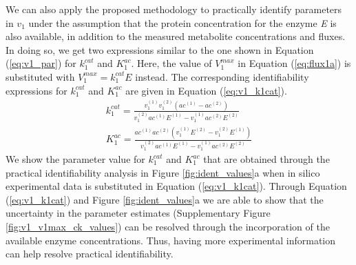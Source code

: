 \documentclass[10pt]{article}
\begin{document}
	We can also apply the proposed methodology to practically identify parameters in $v_1$ under the assumption that the protein concentration for the enzyme \textit{E} is also available, in addition to the measured metabolite concentrations and fluxes. In doing so, we get two expressions similar to the one shown in Equation (\ref{eq:v1_par}) for $k_1^{cat}$ and $K_1^{ac}$. Here, the value of $V_1^{max}$ in Equation (\ref{eq:flux1a}) is substituted with $V_1^{max} = k_1^{cat}E$ instead. The corresponding identifiability expressions for $k_1^{cat}$ and $K_1^{ac}$ are given in Equation (\ref{eq:v1_k1cat}).	
	\begin{subequations}\label{eq:v1_k1cat}
		\begin{align}
		k_1^{cat} = \frac{ v_1^{(1)}v_1^{(2)} \left( ac^{(1)}- ac^{(2)}\right)}{v_1^{(2)}ac^{(1)}E^{(1)} - v_1^{(1)}ac^{(2)}E^{(2)}}\\
		K_1^{ac} = \frac{ac^{(1)}ac^{(2)}\left(v_1^{(1)}E^{(2)} - v_1^{(2)}E^{(1)}\right)}{v_1^{(2)}ac^{(1)}E^{(1)} - v_1^{(1)}ac^{(2)}E^{(2)}}
		\end{align}
	\end{subequations}	
	We show the parameter value for $k_1^{cat}$ and $K_1^{ac}$ that are obtained through the practical identifiability analysis in Figure \ref{fig:ident_values}a when in silico experimental data is substituted in Equation (\ref{eq:v1_k1cat}). Through Equation (\ref{eq:v1_k1cat}) and Figure \ref{fig:ident_values}a we are able to show that the uncertainty in the parameter estimates (Supplementary Figure \ref{fig:v1_v1max_ck_values}) can be resolved through the incorporation of the available enzyme concentrations. Thus, having more experimental information can help resolve practical identifiability.
	
\end{document}
